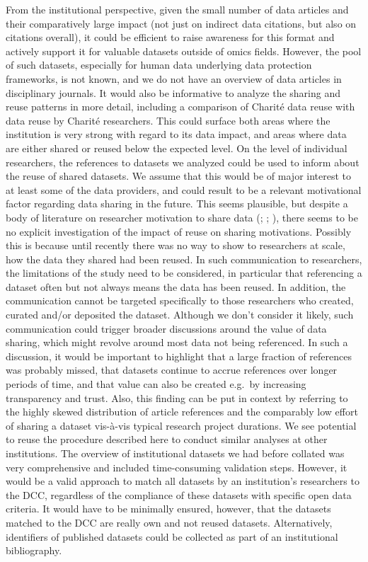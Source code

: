\documentclass[
  letterpaper,
  DIV=11,
  numbers=noendperiod]{scrartcl}
\begin{document}
From the institutional perspective, given the small number of data
articles and their comparatively large impact (not just on indirect data
citations, but also on citations overall), it could be efficient to
raise awareness for this format and actively support it for valuable
datasets outside of omics fields. However, the pool of such datasets,
especially for human data underlying data protection frameworks, is not
known, and we do not have an overview of data articles in disciplinary
journals. It would also be informative to analyze the sharing and reuse
patterns in more detail, including a comparison of Charité data reuse
with data reuse by Charité researchers. This could surface both areas
where the institution is very strong with regard to its data impact, and
areas where data are either shared or reused below the expected level.
On the level of individual researchers, the references to datasets we
analyzed could be used to inform about the reuse of shared datasets. We
assume that this would be of major interest to at least some of the data
providers, and could result to be a relevant motivational factor
regarding data sharing in the future. This seems plausible, but despite
a body of literature on researcher motivation to share data
(;
; ), there seems to be no explicit investigation of the impact of
reuse on sharing motivations. Possibly this is because until recently
there was no way to show to researchers at scale, how the data they
shared had been reused. In such communication to researchers, the
limitations of the study need to be considered, in particular that
referencing a dataset often but not always means the data has been
reused. In addition, the communication cannot be targeted specifically
to those researchers who created, curated and/or deposited the dataset.
Although we don't consider it likely, such communication could trigger
broader discussions around the value of data sharing, which might
revolve around most data not being referenced. In such a discussion, it
would be important to highlight that a large fraction of references was
probably missed, that datasets continue to accrue references over longer
periods of time, and that value can also be created e.g.~by increasing
transparency and trust. Also, this finding can be put in context by
referring to the highly skewed distribution of article references and
the comparably low effort of sharing a dataset vis-à-vis typical
research project durations. We see potential to reuse the procedure
described here to conduct similar analyses at other institutions. The
overview of institutional datasets we had before collated was very
comprehensive and included time-consuming validation steps. However, it
would be a valid approach to match all datasets by an institution's
researchers to the DCC, regardless of the compliance of these datasets
with specific open data criteria. It would have to be minimally ensured,
however, that the datasets matched to the DCC are really own and not
reused datasets. Alternatively, identifiers of published datasets could
be collected as part of an institutional bibliography.
\end{document}
